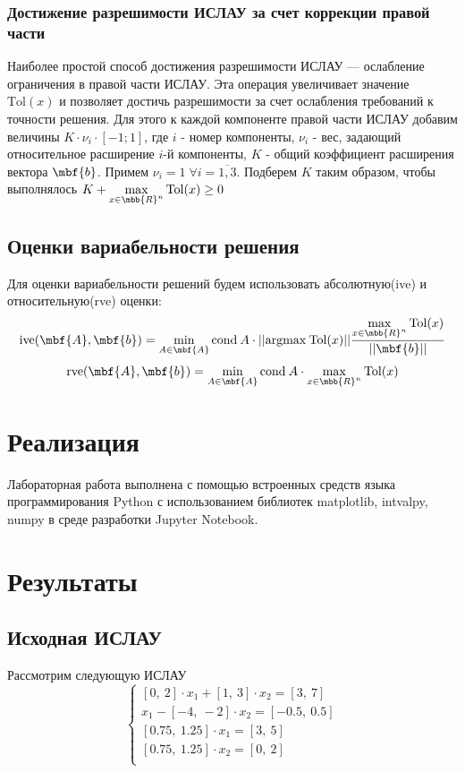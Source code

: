 \documentclass[12pt,a4paper]{article}
\begin{document}
            \subsubsection{Достижение разрешимости ИСЛАУ за счет коррекции правой части}
                Наиболее простой способ достижения разрешимости ИСЛАУ — ослабление
                ограничения в правой части ИСЛАУ. Эта операция увеличивает значение $\mathrm{Tol}(x)$ и позволяет достичь разрешимости за счет ослабления требований к точности решения. Для этого к каждой компоненте правой части ИСЛАУ добавим величины $K\cdot\nu_i\cdot[-1;1]$, где $i$ - номер компоненты, $\nu_i$ - вес, задающий относительное расширение $i$-й компоненты, $K$ - общий коэффициент расширения вектора $\mbf{b}$.
                Примем $\nu_i=1\;\forall i=\overline{1,3}$. Подберем $K$ таким образом, чтобы выполнялось $ K +\max\limits_{x\in\mbb{R}^n}\mathrm{Tol}(x)\geq0$
            
            
            
            
        \subsection{Оценки вариабельности решения}
            Для оценки вариабельности решений будем использовать абсолютную(ive) и относительную(rve) оценки:
            $$\mathrm{ive}(\mbf{A},\mbf{b})=\min\limits_{A\in\mbf{A}}\mathrm{cond}\:A\cdot||\mathrm{argmax}\:\mathrm{Tol}(x)||\frac{\max\limits_{x\in\mbb{R}^n}\mathrm{Tol}(x)}{||\mbf{b}||}$$
            $$\mathrm{rve}(\mbf{A},\mbf{b})=\min\limits_{A\in\mbf{A}}\mathrm{cond}\:A\cdot\max\limits_{x\in\mbb{R}^n}\mathrm{Tol}(x)$$
            
    \section{Реализация}
        Лабораторная работа выполнена с помощью встроенных средств языка программирования Python с использованием библиотек matplotlib, intvalpy, numpy в среде разработки Jupyter Notebook. 
        
    \section{Результаты}
        \subsection{Исходная ИСЛАУ}
        Рассмотрим следующую ИСЛАУ
        \begin{equation}\label{islau}
            \begin{cases}
            [0,\:2]\cdot x_1+[1,\:3]\cdot x_2=[3,\:7]\\
            x_1 - [-4,\:-2]\cdot x_2=[-0.5,\:0.5]\\
            [0.75,\:1.25]\cdot x_1=[3,\:5]\\
            [0.75,\:1.25]\cdot x_2=[0,\:2]\\
            \end{cases}
        \end{equation}
    
\end{document}
